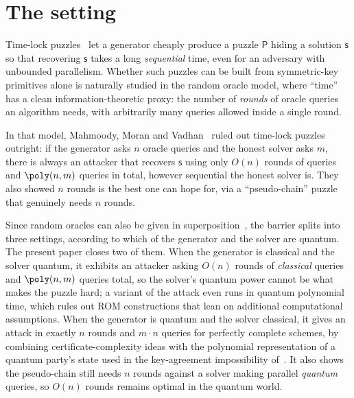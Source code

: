 \documentclass{conjura-conjecture}
\newcommand{\puz}{\mathsf{P}}
\newcommand{\solu}{\mathsf{s}}
\begin{document}
\section{The setting}\label{sec:setting}

Time-lock puzzles~\cite{RSW96} let a generator cheaply produce a puzzle
$\puz$ hiding a solution $\solu$ so that recovering $\solu$ takes a long
\emph{sequential} time, even for an adversary with unbounded parallelism.
Whether such puzzles can be built from symmetric-key primitives alone is
naturally studied in the random oracle model, where ``time'' has a clean
information-theoretic proxy: the number of \emph{rounds} of oracle queries
an algorithm needs, with arbitrarily many queries allowed inside a single
round.

In that model, Mahmoody, Moran and Vadhan~\cite{MMV11} ruled out time-lock
puzzles outright: if the generator asks $n$ oracle queries and the honest
solver asks $m$, there is always an attacker that recovers $\solu$ using
only $O(n)$ rounds of queries and $\poly(n,m)$ queries in total, however
sequential the honest solver is. They also showed $n$ rounds is the best one
can hope for, via a ``pseudo-chain'' puzzle that genuinely needs $n$ rounds.

Since random oracles can also be given in superposition~\cite{BDF11}, the
barrier splits into three settings, according to which of the generator and
the solver are quantum. The present paper closes two of them. When the
generator is classical and the solver quantum, it exhibits an attacker
asking $O(n)$ rounds of \emph{classical} queries and $\poly(n,m)$ queries
total, so the solver's quantum power cannot be what makes the puzzle hard; a
variant of the attack even runs in quantum polynomial time, which rules out
ROM constructions that lean on additional computational assumptions. When
the generator is quantum and the solver classical, it gives an attack in
exactly $n$ rounds and $m \cdot n$ queries for perfectly complete schemes,
by combining certificate-complexity ideas with the polynomial
representation of a quantum party's state used in the key-agreement
impossibility of~\cite{ACC22}. It also shows the pseudo-chain still needs
$n$ rounds against a solver making parallel \emph{quantum} queries, so
$O(n)$ rounds remains optimal in the quantum world.
\end{document}
